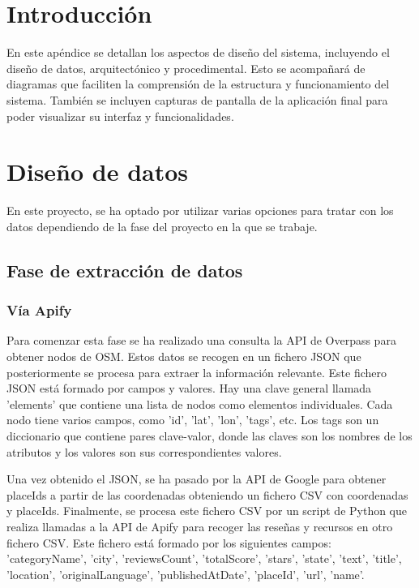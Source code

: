 
\section{Introducción}

En este apéndice se detallan los aspectos de diseño del sistema, incluyendo el diseño de datos, arquitectónico y procedimental. 
Esto se acompañará de diagramas que faciliten la comprensión de la estructura y funcionamiento del sistema.
También se incluyen capturas de pantalla de la aplicación final para poder visualizar su interfaz y funcionalidades.

\section{Diseño de datos}

En este proyecto, se ha optado por utilizar varias opciones para tratar con los datos dependiendo de la fase del proyecto en la que se trabaje.

\subsection{Fase de extracción de datos}

\subsubsection{Vía Apify}

Para comenzar esta fase se ha realizado una consulta la API de Overpass para obtener nodos de OSM. Estos datos se recogen en un fichero JSON que posteriormente se procesa para extraer la información relevante.
Este fichero JSON está formado por campos y valores. Hay una clave general llamada 'elements' que contiene una lista de nodos como elementos individuales. Cada nodo tiene varios campos, como 'id', 'lat', 'lon', 'tags', etc. Los tags son un diccionario que contiene pares clave-valor, donde las claves son los nombres de los atributos y los valores son sus correspondientes valores. 

Una vez obtenido el JSON, se ha pasado por la API de Google para obtener placeIds a partir de las coordenadas obteniendo un fichero CSV con coordenadas y placeIds.
Finalmente, se procesa este fichero CSV por un script de Python que realiza llamadas a la API de Apify para recoger las reseñas y recursos en otro fichero CSV. Este fichero está formado por los siguientes campos: 'categoryName', 'city', 'reviewsCount', 'totalScore', 'stars', 'state', 'text', 'title', 'location', 'originalLanguage', 'publishedAtDate', 'placeId', 'url', 'name'.

